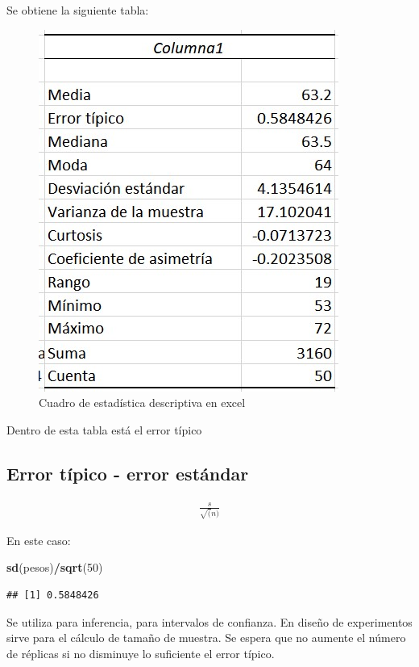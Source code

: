 \documentclass[twocolumn]{article}
\newenvironment{Shaded}{\begin{snugshade}}{\end{snugshade}}
\newcommand{\KeywordTok}[1]{\textcolor[rgb]{0.13,0.29,0.53}{\textbf{#1}}}
\newcommand{\DecValTok}[1]{\textcolor[rgb]{0.00,0.00,0.81}{#1}}
\newcommand{\OperatorTok}[1]{\textcolor[rgb]{0.81,0.36,0.00}{\textbf{#1}}}
\newcommand{\NormalTok}[1]{#1}
\begin{document}
Se obtiene la siguiente tabla:

\begin{figure}
\centering
\includegraphics{./img/EstadisticaDescriptiva.jpg}
\caption{Cuadro de estadística descriptiva en excel}
\end{figure}

Dentro de esta tabla está el error típico

\subsection{Error típico - error
estándar}\label{error-tuxedpico---error-estuxe1ndar}

\begin{align}
\frac{s}{\sqrt(n)}
\end{align}

En este caso:

\begin{Shaded}
\begin{Highlighting}[]
\KeywordTok{sd}\NormalTok{(pesos)}\OperatorTok{/}\KeywordTok{sqrt}\NormalTok{(}\DecValTok{50}\NormalTok{)}
\end{Highlighting}
\end{Shaded}

\begin{verbatim}
## [1] 0.5848426
\end{verbatim}

Se utiliza para inferencia, para intervalos de confianza. En diseño de
experimentos sirve para el cálculo de tamaño de muestra. Se espera que
no aumente el número de réplicas si no disminuye lo suficiente el error
típico.
\end{document}
